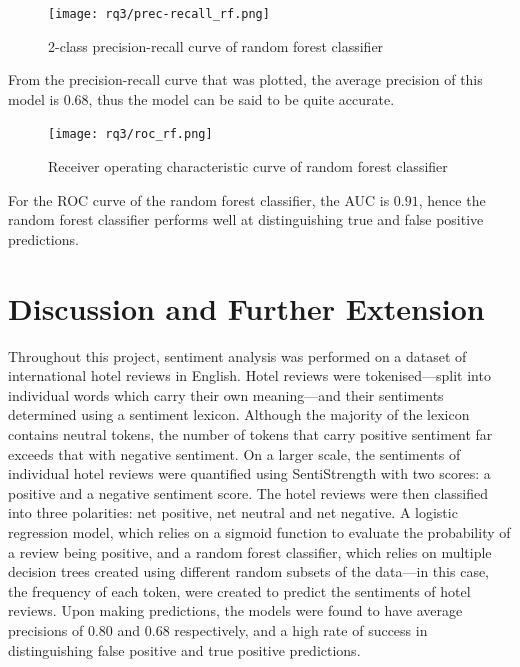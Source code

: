 \documentclass[12pt, bibliography=totocnumbered, paper=a4]{scrartcl}
\begin{document}
\begin{figure}[htpb]
	\begin{center}
		\texttt{[image: rq3/prec-recall\_rf.png]}
	\end{center}
	\caption{2-class precision-recall curve of random forest classifier}
	\label{fig:rf-prcurve}
\end{figure}

From the precision-recall curve that was plotted, the average precision
of this model is $0.68$, thus the model can be said to be quite accurate.

\begin{figure}[htpb]
	\begin{center}
		\texttt{[image: rq3/roc\_rf.png]}
	\end{center}
	\caption{Receiver operating characteristic curve of random forest classifier}
	\label{fig:rf-roc}
\end{figure}

For the ROC curve of the random forest classifier, the AUC is $0.91$, hence
the random forest classifier performs well at distinguishing true and false
positive predictions.

\section{Discussion and Further Extension}
Throughout this project, sentiment analysis was performed on a dataset of
international hotel reviews in English. Hotel reviews were tokenised---split
into individual words which carry their own meaning---and their sentiments
determined using a sentiment lexicon. Although the majority of the lexicon
contains neutral tokens, the number of tokens that carry positive sentiment
far exceeds that with negative sentiment. On a larger scale, the sentiments
of individual hotel reviews were quantified using SentiStrength with two scores:
a positive and a negative sentiment score. The hotel reviews were then classified
into three polarities: net positive, net neutral and net negative. A logistic
regression model, which relies on a sigmoid function to evaluate the probability
of a review being positive, and a random forest classifier, which relies on multiple
decision trees created using different random subsets of the data---in this case, the
frequency of each token, were created to predict the sentiments of hotel reviews. Upon
making predictions, the models were found to have average precisions of $0.80$ and $0.68$
respectively, and a high rate of success in distinguishing false positive
and true positive predictions.
\end{document}
